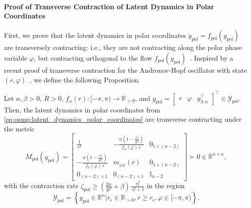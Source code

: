 \paragraph{Proof of Transverse Contraction of Latent Dynamics in Polar Coordinates}
First, we prove that the latent dynamics in polar coordinates $\dot{y}_\mathrm{pol} = f_\mathrm{pol}(y_\mathrm{pol})$ are transversely contracting: i.e., they are not contracting along the polar phase variable $\varphi$, but contracting orthogonal to the flow $f_\mathrm{pol}(y_\mathrm{pol})$~\citep{manchester2014transverse}. Inspired by a recent proof of transverse contraction for the Andronov-Hopf oscillator with state $(r, \varphi)$~\citep{nah2025combining}, we define the following Proposition.
\begin{proposition}\label{prop:osmp:polar_latent_dynamics_transverse_contraction}
    Let $\alpha, \beta > 0$, $R > 0$, $f_\omega(r): [-\pi, \pi) \to \mathbb{R}_{>0}$, and $y_\mathrm{pol} = \begin{bmatrix}
    r & \varphi & y_{3:n}^\top
\end{bmatrix}^\top \in \mathcal{Y}_\mathrm{pol}$. Then, the latent dynamics in polar coordinates from \eqref{eq:osmp:latent_dynamics_polar_coordinates} are transverse contracting under the metric
    \begin{equation}\label{eq:osmp:contraction_metric_polar_latent_dynamics}
        M_\mathrm{pol}(y_\mathrm{pol}) = \begin{bmatrix}
            \frac{1}{r^2} & -\frac{\alpha \left( 1 - \frac{r^2}{R^2} \right )}{f_\omega(\varphi) \, r} & 0_{1 \times (n-2)}\\
            -\frac{\alpha \left( 1 - \frac{r^2}{R^2} \right )}{f_\omega(\varphi) \, r} & m_{\varphi \varphi}(r) & 0_{1 \times (n-2)}\\
            0_{(n-2) \times 1} & 0_{(n-2) \times 1} & \mathbb{I}_{n-2}
        \end{bmatrix} \succ 0 \in \mathbb{R}^{n \times n},
    \end{equation}
    with the contraction rate $\zeta_\mathrm{pol} \geq \left (\frac{2\alpha}{R^2} + \beta \right ) \, \frac{r_\epsilon^2}{r_\epsilon^2 + 1}$ in the region
    \begin{equation}
        \mathcal{Y}_\mathrm{pol} = \left \{ y_\mathrm{pol} \in \mathbb{R}^n | r_\epsilon \in \mathbb{R}_{>0}, r \geq r_\epsilon, \varphi \in [-\pi, \pi) \right \}.
    \end{equation}
\end{proposition}
